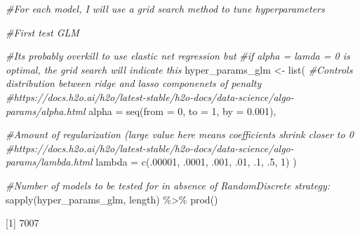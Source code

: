 \documentclass[
]{article}
\newenvironment{Shaded}{\begin{snugshade}}{\end{snugshade}}
\newcommand{\AttributeTok}[1]{\textcolor[rgb]{0.77,0.63,0.00}{#1}}
\newcommand{\CommentTok}[1]{\textcolor[rgb]{0.56,0.35,0.01}{\textit{#1}}}
\newcommand{\DecValTok}[1]{\textcolor[rgb]{0.00,0.00,0.81}{#1}}
\newcommand{\FloatTok}[1]{\textcolor[rgb]{0.00,0.00,0.81}{#1}}
\newcommand{\FunctionTok}[1]{\textcolor[rgb]{0.00,0.00,0.00}{#1}}
\newcommand{\NormalTok}[1]{#1}
\newcommand{\OtherTok}[1]{\textcolor[rgb]{0.56,0.35,0.01}{#1}}
\newcommand{\SpecialCharTok}[1]{\textcolor[rgb]{0.00,0.00,0.00}{#1}}
\begin{document}
\begin{Shaded}
\begin{Highlighting}[]
\CommentTok{\#For each model, I will use a grid search method to tune hyperparameters}

\CommentTok{\#First test GLM}

\CommentTok{\#It\textquotesingle{}s probably overkill to use elastic net regression but }
\CommentTok{\#if alpha = lamda = 0 is optimal, the grid search will indicate this}
\NormalTok{hyper\_params\_glm }\OtherTok{\textless{}{-}} \FunctionTok{list}\NormalTok{(}
  \CommentTok{\#Controls distribution between ridge and lasso componenets of penalty}
  \CommentTok{\#https://docs.h2o.ai/h2o/latest{-}stable/h2o{-}docs/data{-}science/algo{-}params/alpha.html}
  \AttributeTok{alpha =} \FunctionTok{seq}\NormalTok{(}\AttributeTok{from =} \DecValTok{0}\NormalTok{, }\AttributeTok{to =} \DecValTok{1}\NormalTok{, }\AttributeTok{by =} \FloatTok{0.001}\NormalTok{),}
  
  \CommentTok{\#Amount of regularization (large value here means coefficients shrink closer to 0}
  \CommentTok{\#https://docs.h2o.ai/h2o/latest{-}stable/h2o{-}docs/data{-}science/algo{-}params/lambda.html}
  \AttributeTok{lambda =} \FunctionTok{c}\NormalTok{(.}\DecValTok{00001}\NormalTok{, .}\DecValTok{0001}\NormalTok{, .}\DecValTok{001}\NormalTok{, .}\DecValTok{01}\NormalTok{, .}\DecValTok{1}\NormalTok{, .}\DecValTok{5}\NormalTok{, }\DecValTok{1}\NormalTok{)}
\NormalTok{)}

\CommentTok{\#Number of models to be tested for in absence of RandomDiscrete strategy:}
\FunctionTok{sapply}\NormalTok{(hyper\_params\_glm, length) }\SpecialCharTok{\%\textgreater{}\%} \FunctionTok{prod}\NormalTok{()}
\end{Highlighting}
\end{Shaded}

{[}1{]} 7007
\end{document}
